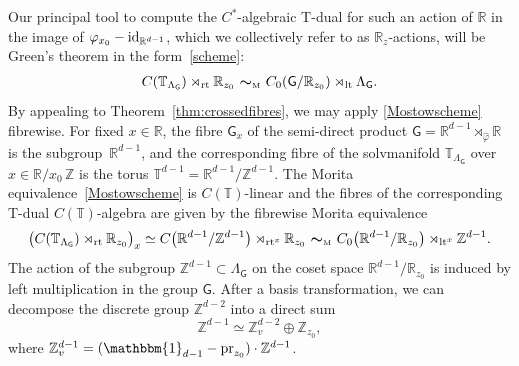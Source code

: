 \documentclass[10pt,a4paper]{amsart}
\numberwithin{equation}{section}
\newcommand{\Z}{\zed}
\newcommand{\mbf}[1]{{\boldsymbol {#1} }}
\def\Id{{\rm id}}
\newcommand{\unit}{\mathbbm{1}} 			%
\newcommand{\sfG}{\mathsf{G}}
\newcommand{\lt}{{\rm lt}}
\newcommand{\rt}{{\rm rt}}
\newcommand{\R}{\real}
\newcommand{\zed}{{\mathbb Z}} %
\newcommand{\real}{{\mathbb R}} %
\newcommand{\torus}{{\mathbb T}} %
\newcommand{\proj}{{\rm pr}}
\begin{document}
Our principal tool to compute the $C^*$-algebraic
T-dual for such an action of $\R$ in the image of $\varphi_{x_0}-\Id_{\R^{d-1}}$, which we collectively refer to as
$\R_z$-actions, will be Green's theorem in the form~\eqref{scheme}:
\begin{gather}\label{Mostowscheme}
C(\torus_{\Lambda_\sfG})\rtimes_\rt \real_{ z_0} \ \mbf\sim_{\text{\tiny M}} \
C_0(\sfG/\real_{ z_0})\rtimes_\lt \Lambda_\sfG .
\end{gather}
By appealing to
Theorem~\ref{thm:crossedfibres}, we may apply \eqref{Mostowscheme}
fibrewise. For fixed $x\in\R$, the fibre $\sfG_x$ of the semi-direct
product $\sfG=\R^{d-1}\rtimes_{\hat\varphi}\R$ is the subgroup~$\R^{d-1}$, and the corresponding fibre of
the solvmanifold $\torus_{\Lambda_\sfG}$ over $x\in\R/x_0\,\Z$ is the
torus $\torus^{d-1}=\R^{d-1}/\Z^{d-1}$. The Morita
equivalence~\eqref{Mostowscheme} is $C(\torus)$-linear and the fibres of the corresponding
T-dual $C(\torus)$-algebra are given by the fibrewise Morita
equivalence
\begin{gather}\label{eq:Mostowschemefiber}
\big(C(\torus_{\Lambda_\sfG})\rtimes_\rt\real_{ z_0}\big)_x \simeq
C\big(\R^{d-1}/\Z^{d-1}\big)\rtimes_{\rt^x}\real_{ z_0} \
\mbf\sim_{\text{\tiny M}} \
C_0\big(\real^{d-1}/\R_{ z_0}\big)\rtimes_{\lt^x}\Z^{d-1} .
\end{gather}
The action of the subgroup $\Z^{d-1}\subset\Lambda_\sfG$ on the
coset space $\R^{d-1}/\R_{ z_0}$ is induced by left multiplication in the
group $\sfG$.
After a basis transformation, we can decompose the discrete group $\Z^{d-2}$ into a direct sum
\[
\Z^{d-1} \simeq \Z_v^{d-2}\oplus\Z_{ z_0} ,
\]
where $\Z_v^{d-1} = (\unit_{d-1}-\proj_{z_0})\cdot\Z^{d-1}$.
\end{document}
